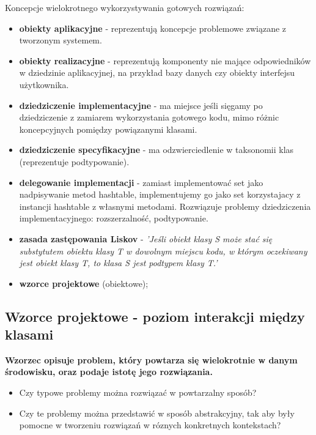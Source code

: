 \documentclass[a4paper]{article}
\begin{document}
    Koncepcje wielokrotnego wykorzystywania gotowych rozwiązań:
    \begin{itemize}
        \item \textbf{obiekty aplikacyjne} - reprezentują koncepcje problemowe związane z tworzonym systemem.
        \item \textbf{obiekty realizacyjne} - reprezentują komponenty nie mające odpowiedników w
        dziedzinie aplikacyjnej, na przykład bazy danych czy obiekty interfejsu użytkownika.
        \item \textbf{dziedziczenie implementacyjne} - ma miejsce jeśli sięgamy po dziedziczenie z zamiarem wykorzystania
        gotowego kodu, mimo różnic koncepcyjnych pomiędzy powiązanymi klasami.
        \item \textbf{dziedziczenie specyfikacyjne} - ma odzwierciedlenie w taksonomii klas (reprezentuje podtypowanie).
        \item \textbf{delegowanie implementacji} - zamiast implementować set jako nadpisywanie metod hashtable, implementujemy go jako set korzystajacy z instancji hashtable z własnymi metodami.
        Rozwiązuje problemy dziedziczenia implementacyjnego: rozszerzalność, podtypowanie.
        \item \textbf{zasada zastępowania Liskov} - \textit{'Jeśli obiekt klasy S może stać się substytutem obiektu klasy T w
        dowolnym miejscu kodu, w którym oczekiwany jest obiekt klasy T, to klasa S jest podtypem klasy T.'}
        \item \textbf{wzorce projektowe} (obiektowe);
    \end{itemize}



    \subsection{Wzorce projektowe - poziom interakcji między klasami}
    \textbf{Wzorzec opisuje problem, który powtarza się wielokrotnie w danym środowisku, oraz podaje istotę
    jego rozwiązania.}

    \begin{itemize}
        \item Czy typowe problemy można rozwiązać w powtarzalny sposób?
        \item Czy te problemy można przedstawić w sposób abstrakcyjny, tak aby były pomocne
        w tworzeniu rozwiązań w róznych konkretnych kontekstach?
    \end{itemize}
\end{document}

